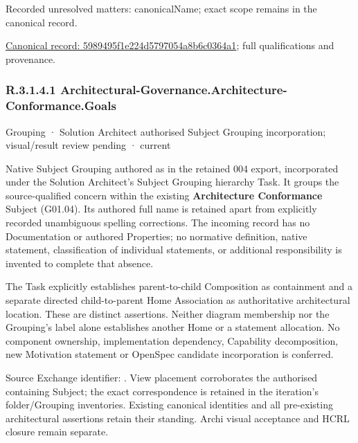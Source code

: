 {\small Recorded unresolved matters: canonicalName; exact scope remains in the canonical record.}\par
{\footnotesize \href{../../../../continuum/grouping/5989495f1e224d5797054a8b6c0364a1.md}{Canonical record: 5989495f1e224d5797054a8b6c0364a1}; full qualifications and provenance.}\par
\subsubsection*{R.3.1.4.1 Architectural-Governance.Architecture-Conformance.Goals}
\label{navigation:R.3.1.4.1}

\label{element:b47210a43fe147d4a3f2fbc081321063}
{\small Grouping · Solution Architect authorised Subject Grouping incorporation; visual/result review pending · current}\par

Native Subject Grouping authored as \texttt{} in the retained 004 export,
incorporated under the Solution Architect's Subject Grouping hierarchy Task.
It groups the source-qualified \texttt{} concern within
the existing \textbf{Architecture Conformance} Subject (G01.04). Its authored full name
is retained apart from explicitly recorded unambiguous spelling corrections.
The incoming record has no Documentation or authored Properties; no normative
definition, native statement, classification of individual statements, or
additional responsibility is invented to complete that absence.



The Task explicitly establishes parent-to-child Composition as containment and
a separate directed child-to-parent Home Association as authoritative architectural
location. These are distinct assertions. Neither diagram membership nor the
Grouping's label alone establishes another Home or a statement allocation.
No component ownership, implementation dependency, Capability decomposition,
new Motivation statement or OpenSpec candidate incorporation is conferred.



Source Exchange identifier: \texttt{}. View placement corroborates
the authorised containing Subject; the exact correspondence is retained in the
iteration's folder/Grouping inventories. Existing canonical identities and all
pre-existing architectural assertions retain their standing. Archi visual
acceptance and HCRL closure remain separate.


